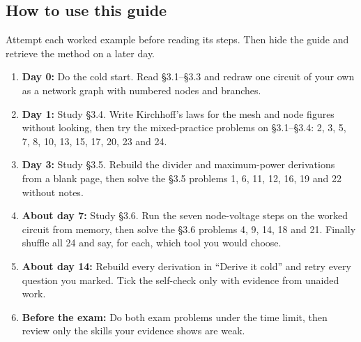 \documentclass[11pt]{article}
\begin{document}
\begin{keepsection}
\section{How to use this guide}

Attempt each worked example before reading its steps. Then hide the guide and retrieve the method on a later day.

\begin{enumerate}
\item \textbf{Day 0:} Do the cold start. Read §3.1–§3.3 and redraw one circuit of your own as a network graph with numbered nodes and branches.
\item \textbf{Day 1:} Study §3.4. Write Kirchhoff’s laws for the mesh and node figures without looking, then try the mixed-practice problems on §3.1–§3.4: 2, 3, 5, 7, 8, 10, 13, 15, 17, 20, 23 and 24.
\item \textbf{Day 3:} Study §3.5. Rebuild the divider and maximum-power derivations from a blank page, then solve the §3.5 problems 1, 6, 11, 12, 16, 19 and 22 without notes.
\item \textbf{About day 7:} Study §3.6. Run the seven node-voltage steps on the worked circuit from memory, then solve the §3.6 problems 4, 9, 14, 18 and 21. Finally shuffle all 24 and say, for each, which tool you would choose.
\item \textbf{About day 14:} Rebuild every derivation in “Derive it cold” and retry every question you marked. Tick the self-check only with evidence from unaided work.
\item \textbf{Before the exam:} Do both exam problems under the time limit, then review only the skills your evidence shows are weak.
\end{enumerate}
\end{keepsection}
\end{document}
